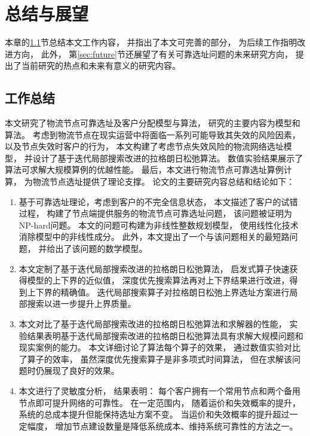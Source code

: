  \setlength{\baselineskip}{20pt}
\chapter{总结与展望}
\label{cha:summary}

本章的\ref{sec:summary}节总结本文工作内容，
并指出了本文可完善的部分，
为后续工作指明改进方向，
此外，
第\ref{sec:future}节还展望了有关可靠选址问题的未来研究方向，
提出了当前研究的热点和未来有意义的研究内容。


\section{工作总结}
\label{sec:summary}
本文研究了物流节点可靠选址及客户分配模型与算法，
研究的主要内容为模型和算法。
考虑到物流节点在现实运营中将面临一系列可能导致其失效的风险因素，
以及节点失效时客户的行为，
本文构建了考虑节点失效风险的物流网络选址模型，
并设计了基于迭代局部搜索改进的拉格朗日松弛算法。
数值实验结果展示了算法可求解大规模算例的优越性能。
最后，本文进行物流节点可靠选址算例计算，
为物流节点选址提供了理论支撑。
论文的主要研究内容总结和结论如下：

\begin{enumerate}[label=(\arabic*),leftmargin=0pt,itemindent=3.5\ccwd, nosep]
    \item 基于可靠选址理论，考虑到客户的不完全信息状态，
    本文描述了客户的试错过程，
    构建了节点端提供服务的物流节点可靠选址问题，
    该问题被证明为NP-hard问题。
    本文的问题可构建为非线性整数规划模型，
    使用线性化技术消除模型中的非线性成分。
    此外，本文提出了一个与该问题相关的最短路问题，
    并给出了该问题的数学模型。
    
    \item 本文定制了基于迭代局部搜索改进的拉格朗日松弛算法，
    启发式算子快速获得模型的上下界的近似值，
    深度优先搜索算法再对上下界结果进行改进，得到上下界的精确值。
    迭代局部搜索算子对拉格朗日松弛上界选址方案进行局部搜索以进一步提升上界质量。

    \item 本文对比了基于迭代局部搜索改进的拉格朗日松弛算法和求解器的性能，
    实验结果表明基于迭代局部搜索改进的拉格朗日松弛算法具有求解大规模问题和现实案例的能力。
    本文详细讨论了算法每个算子的效果，
    通过数值实验对比了算子的效率，
    虽然深度优先搜索算子是非多项式时间算法，
    但在求解该问题时仍展现了良好的效果。
    
    \item 本文进行了灵敏度分析，
    结果表明：
    每个客户拥有一个常用节点和两个备用节点即可提升网络的可靠性。
    在一定范围内，
    随着运价和失效概率的提升，
    系统的总成本提升但能保持选址方案不变。
    当运价和失效概率的提升超过一定幅度，
    增加节点建设数量是降低系统成本、维持系统可靠性的方法之一。
    
\end{enumerate}

